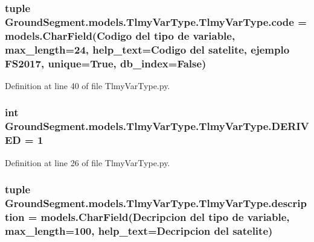 \subsubsection[{code}]{\setlength{\rightskip}{0pt plus 5cm}tuple Ground\+Segment.\+models.\+Tlmy\+Var\+Type.\+Tlmy\+Var\+Type.\+code = models.\+Char\+Field(\textquotesingle{}Codigo del tipo de variable\textquotesingle{}, max\+\_\+length=24, help\+\_\+text=\textquotesingle{}Codigo del satelite, ejemplo F\+S2017\textquotesingle{}, unique=True, db\+\_\+index=False)\hspace{0.3cm}{\ttfamily [static]}}\label{class_ground_segment_1_1models_1_1_tlmy_var_type_1_1_tlmy_var_type_ace8a3c643e6fbce147864aae31381c70}


Definition at line 40 of file Tlmy\+Var\+Type.\+py.

\hypertarget{class_ground_segment_1_1models_1_1_tlmy_var_type_1_1_tlmy_var_type_a8b88adc2cddecf7dce5eedc89042a2cd}{}
\subsubsection[{D\+E\+R\+I\+V\+E\+D}]{\setlength{\rightskip}{0pt plus 5cm}int Ground\+Segment.\+models.\+Tlmy\+Var\+Type.\+Tlmy\+Var\+Type.\+D\+E\+R\+I\+V\+E\+D = 1\hspace{0.3cm}{\ttfamily [static]}}\label{class_ground_segment_1_1models_1_1_tlmy_var_type_1_1_tlmy_var_type_a8b88adc2cddecf7dce5eedc89042a2cd}


Definition at line 26 of file Tlmy\+Var\+Type.\+py.

\hypertarget{class_ground_segment_1_1models_1_1_tlmy_var_type_1_1_tlmy_var_type_a38f73b6c16a785c3107380614d676116}{}
\subsubsection[{description}]{\setlength{\rightskip}{0pt plus 5cm}tuple Ground\+Segment.\+models.\+Tlmy\+Var\+Type.\+Tlmy\+Var\+Type.\+description = models.\+Char\+Field(\textquotesingle{}Decripcion del tipo de variable\textquotesingle{}, max\+\_\+length=100, help\+\_\+text=\textquotesingle{}Decripcion del satelite\textquotesingle{})\hspace{0.3cm}{\ttfamily [static]}}\label{class_ground_segment_1_1models_1_1_tlmy_var_type_1_1_tlmy_var_type_a38f73b6c16a785c3107380614d676116}


